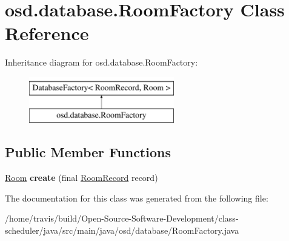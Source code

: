 \hypertarget{classosd_1_1database_1_1_room_factory}{\section{osd.\-database.\-Room\-Factory Class Reference}
\label{classosd_1_1database_1_1_room_factory}
}
Inheritance diagram for osd.\-database.\-Room\-Factory\-:\begin{figure}[H]
\begin{center}
\leavevmode
\includegraphics[height=2.000000cm]{classosd_1_1database_1_1_room_factory}
\end{center}
\end{figure}
\subsection*{Public Member Functions}
\begin{DoxyCompactItemize}
\item 
\hypertarget{classosd_1_1database_1_1_room_factory_a67be9e75d752fd52f9843c68b8b2d0b0}{\hyperlink{interfaceosd_1_1input_1_1_room}{Room} {\bfseries create} (final \hyperlink{classosd_1_1database_1_1_room_record}{Room\-Record} record)}\label{classosd_1_1database_1_1_room_factory_a67be9e75d752fd52f9843c68b8b2d0b0}

\end{DoxyCompactItemize}


The documentation for this class was generated from the following file\-:\begin{DoxyCompactItemize}
\item 
/home/travis/build/\-Open-\/\-Source-\/\-Software-\/\-Development/class-\/scheduler/java/src/main/java/osd/database/Room\-Factory.\-java\end{DoxyCompactItemize}
